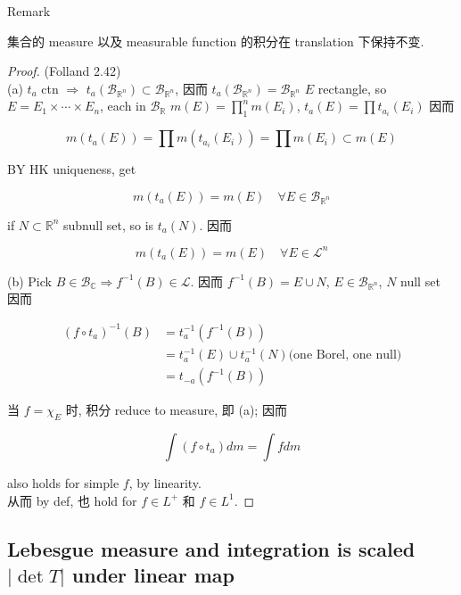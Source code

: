 \documentclass{qlnotes-export}
\begin{document}
\begin{qlremark}{Remark}

集合的 measure 以及 measurable function 的积分在 translation 下保持不变.

\end{qlremark}

\begin{proof}

(Folland 2.42)\\
(a) \(t_{a}\) ctn \(\Longrightarrow\) \(t_{a}(\mathcal{B}_{{\mathbb{R}}^{n}}) \subset \mathcal{B}_{{\mathbb{R}}^{n}}\), 因而 \(t_{a}(\mathcal{B}_{{\mathbb{R}}^{n}}) = \mathcal{B}_{{\mathbb{R}}^{n}}\) \(E\) rectangle, so \(E = E_{1} \times \cdots \times E_{n}\), each in \(\mathcal{B}_{\mathbb{R}}\) \(m(E) = \prod_{1}^{n}m(E_{i})\), \(t_{a}(E) = \prod t_{a_{i}}(E_{i})\) 因而

\[m(t_{a}(E)) = \prod m(t_{a_{i}}(E_{i})) = \prod m(E_{i}) \subset m(E)\]

BY HK uniqueness, get

\[m(t_{a}(E)) = m(E)\quad\forall E \in \mathcal{B}_{{\mathbb{R}}^{n}}\]

if \(N \subset {\mathbb{R}}^{n}\) subnull set, so is \(t_{a}(N)\). 因而

\[m(t_{a}(E)) = m(E)\quad\forall E \in \mathcal{L}^{n}\]

(b) Pick \(B \in \mathcal{B}_{\mathbb{C}}\Longrightarrow f^{- 1}(B) \in \mathcal{L}\). 因而 \(f^{- 1}(B) = E \cup N\), \(E \in \mathcal{B}_{{\mathbb{R}}^{n}}\), \(N\) null set 因而

\[\begin{matrix}
{(f \circ t_{a})^{- 1}(B)} & {= t_{a}^{- 1}(f^{- 1}(B))} \\
 & {= t_{a}^{- 1}(E) \cup t_{a}^{- 1}(N)\text{(one Borel, one null)}} \\
 & {= t_{- a}(f^{- 1}(B))}
\end{matrix}\]

当 \(f = \chi_{E}\) 时, 积分 reduce to measure, 即 (a); 因而

\[\int(f \circ t_{a}) dm = \int f dm\]

also holds for simple \(f\), by linearity.\\
从而 by def, 也 hold for \(f \in L^{+}\) 和 \(f \in L^{1}\).

\end{proof}

\subsection{\texorpdfstring{Lebesgue measure and integration is scaled \(|\det T|\) under linear map}{Lebesgue measure and integration is scaled \textbar\textbackslash det T\textbar{} under linear map}}\label{lebesgue-measure-and-integration-is-scaled-det-t-under-linear-map}
\end{document}
